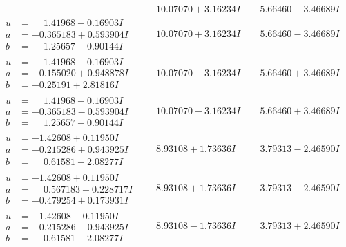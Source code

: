 \documentclass[1p]{elsarticle_modified}
\theoremstyle{definition}
\begin{document}
$$\begin{array}{c|c|c}
 & \phantom{-}10.07070 + 3.16234 I & \phantom{-}5.66460 - 3.46689 I \\ \hline\begin{aligned}
u &= \phantom{-}1.41968 + 0.16903 I \\
a &= -0.365183 + 0.593904 I \\
b &= \phantom{-}1.25657 + 0.90144 I\end{aligned}
 & \phantom{-}10.07070 + 3.16234 I & \phantom{-}5.66460 - 3.46689 I \\ \hline\begin{aligned}
u &= \phantom{-}1.41968 - 0.16903 I \\
a &= -0.155020 + 0.948878 I \\
b &= -0.25191 + 2.81816 I\end{aligned}
 & \phantom{-}10.07070 - 3.16234 I & \phantom{-}5.66460 + 3.46689 I \\ \hline\begin{aligned}
u &= \phantom{-}1.41968 - 0.16903 I \\
a &= -0.365183 - 0.593904 I \\
b &= \phantom{-}1.25657 - 0.90144 I\end{aligned}
 & \phantom{-}10.07070 - 3.16234 I & \phantom{-}5.66460 + 3.46689 I \\ \hline\begin{aligned}
u &= -1.42608 + 0.11950 I \\
a &= -0.215286 + 0.943925 I \\
b &= \phantom{-}0.61581 + 2.08277 I\end{aligned}
 & \phantom{-}8.93108 + 1.73636 I & \phantom{-}3.79313 - 2.46590 I \\ \hline\begin{aligned}
u &= -1.42608 + 0.11950 I \\
a &= \phantom{-}0.567183 - 0.228717 I \\
b &= -0.479254 + 0.173931 I\end{aligned}
 & \phantom{-}8.93108 + 1.73636 I & \phantom{-}3.79313 - 2.46590 I \\ \hline\begin{aligned}
u &= -1.42608 - 0.11950 I \\
a &= -0.215286 - 0.943925 I \\
b &= \phantom{-}0.61581 - 2.08277 I\end{aligned}
 & \phantom{-}8.93108 - 1.73636 I & \phantom{-}3.79313 + 2.46590 I \\ \hline\begin{aligned}

\end{aligned}
\end{array}$$
\end{document}
